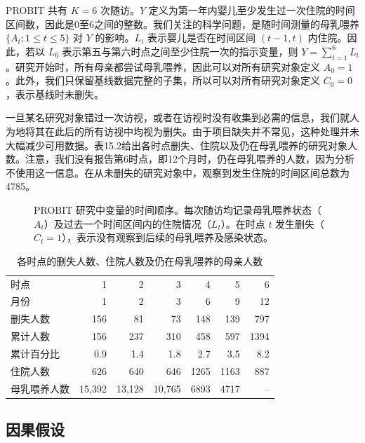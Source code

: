 PROBIT 共有 $K=6$ 次随访。$Y$ 定义为第一年内婴儿至少发生过一次住院的时间区间数，因此是0至6之间的整数。我们关注的科学问题，是随时间测量的母乳喂养 $\{A_t;1\leq t\leq5\}$ 对 $Y$ 的影响。$L_t$ 表示婴儿是否在时间区间 $(t-1,t)$ 内住院。因此，若以 $L_6$ 表示第五与第六时点之间至少住院一次的指示变量，则 $Y=\sum_{t=1}^{6}L_t$。研究开始时，所有母亲都尝试母乳喂养，因此可以对所有研究对象定义 $A_0=1$。此外，我们只保留基线数据完整的子集，所以可以对所有研究对象定义 $C_0=0$，表示基线时未删失。

一旦某名研究对象错过一次访视，或者在访视时没有收集到必需的信息，我们就人为地将其在此后的所有访视中均视为删失。由于项目缺失并不常见，这种处理并未大幅减少可用数据。表15.2给出各时点删失、住院以及仍在母乳喂养的研究对象人数。注意，我们没有报告第6时点，即12个月时，仍在母乳喂养的人数，因为分析不使用这一信息。在从未删失的研究对象中，观察到发生住院的时间区间总数为4785。

\begin{figure}[htbp]
\centering

\caption{PROBIT 研究中变量的时间顺序。每次随访均记录母乳喂养状态（$A_t$）及过去一个时间区间内的住院情况（$L_t$）。在时点 $t$ 发生删失（$C_t=1$），表示没有观察到后续的母乳喂养及感染状态。}
\label{fig:ch15-time-order}
\end{figure}

\begin{table}[htbp]
\centering
\caption{各时点的删失人数、住院人数及仍在母乳喂养的母亲人数}
\label{tab:ch15-longitudinal}
\small
\setlength{\tabcolsep}{5pt}
\begin{tabular}{lrrrrrr}
\toprule
时点 & 1 & 2 & 3 & 4 & 5 & 6\\
月份 & 1 & 2 & 3 & 6 & 9 & 12\\
\midrule
删失人数 & 156 & 81 & 73 & 148 & 139 & 797\\
累计人数 & 156 & 237 & 310 & 458 & 597 & 1394\\
累计百分比 & 0.9 & 1.4 & 1.8 & 2.7 & 3.5 & 8.2\\
\addlinespace
住院人数 & 626 & 640 & 646 & 1265 & 1163 & 887\\
母乳喂养人数 & 15,392 & 13,128 & 10,765 & 6893 & 4717 & --\\
\bottomrule
\end{tabular}
\end{table}
\FloatBarrier

\subsection{因果假设}

